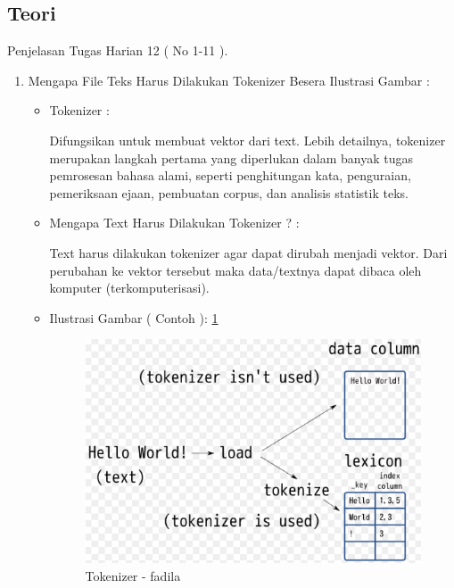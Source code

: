 \subsection{Teori}
Penjelasan Tugas Harian 12 ( No 1-11 ).
\begin{enumerate}
\item Mengapa File Teks Harus Dilakukan Tokenizer Besera Ilustrasi Gambar :
\begin{itemize}
\item Tokenizer :
\par Difungsikan untuk membuat vektor dari text. Lebih detailnya, tokenizer merupakan langkah pertama yang diperlukan dalam banyak tugas pemrosesan bahasa alami, seperti penghitungan kata, penguraian, pemeriksaan ejaan, pembuatan corpus, dan analisis statistik teks.
\par
\par
\item Mengapa Text Harus Dilakukan Tokenizer ? :
\par Text harus dilakukan tokenizer agar dapat dirubah menjadi vektor. Dari perubahan ke vektor tersebut maka data/textnya dapat dibaca oleh komputer (terkomputerisasi).
\par
\par
\item Ilustrasi Gambar ( Contoh ): \ref{chapter-7-tokenizer-fadila}
\par
\begin{figure}[!hbtp]
\centering
\includegraphics[scale=0.2]{figures/chapter-7-tokenizer-fadila.png}
\caption{Tokenizer - fadila}
\label{chapter-7-tokenizer-fadila}
\end{figure}
\par
\end{itemize}

\end{enumerate}
